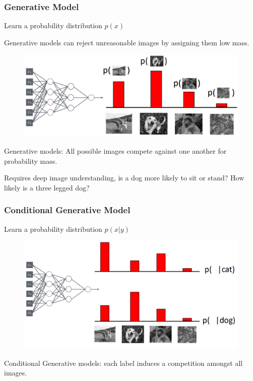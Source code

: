 \subsubsection{Generative Model}
Learn a probability distribution \(p(x)\)

Generative models can reject unreasonable images by assigning them low mass.
\begin{figure}[!h]
    \includegraphics[width = \columnwidth]{figures/GenAI1/GenerativeModel.png}
\end{figure}

Generative models: All possible images compete against one another for probability mass.

Requires deep image understanding, is a dog more likely to sit or stand? How likely is a three legged dog?

\subsubsection{Conditional Generative Model}
Learn a probability distribution \(p(x|y)\)

\begin{figure}[!h]
    \includegraphics[width = \columnwidth]{figures/GenAI1/ConditionalGenerativeModel.png}
\end{figure}
Conditional Generative models: each label induces a competition amongst all images.


